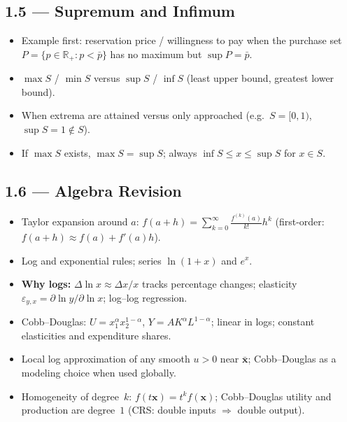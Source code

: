 \documentclass[11pt,a4paper]{article}
\begin{document}
\subsection{1.5 --- Supremum and Infimum}
\begin{itemize}[leftmargin=*]
    \item Example first: reservation price / willingness to pay when the purchase set
      $P=\{p\in\mathbb{R}_+:p<\bar p\}$ has no maximum but $\sup P=\bar p$.
    \item $\max S$ / $\min S$ versus $\sup S$ / $\inf S$ (least upper bound, greatest lower bound).
    \item When extrema are attained versus only approached (e.g.\ $S=[0,1)$, $\sup S=1\notin S$).
    \item If $\max S$ exists, $\max S=\sup S$; always $\inf S\le x\le\sup S$ for $x\in S$.
\end{itemize}

\subsection{1.6 --- Algebra Revision}
\begin{itemize}[leftmargin=*]
    \item Taylor expansion around $a$:
      $f(a+h)=\sum_{k=0}^{\infty}\frac{f^{(k)}(a)}{k!}h^k$ (first-order: $f(a+h)\approx f(a)+f'(a)h$).
    \item Log and exponential rules; series $\ln(1+x)$ and $e^x$.
    \item \textbf{Why logs:} $\Delta\ln x\approx \Delta x/x$ tracks percentage changes;
      elasticity $\varepsilon_{y,x}=\partial\ln y/\partial\ln x$; log--log regression.
    \item Cobb--Douglas: $U=x_1^{\alpha}x_2^{1-\alpha}$, $Y=AK^{\alpha}L^{1-\alpha}$;
      linear in logs; constant elasticities and expenditure shares.
    \item Local log approximation of any smooth $u>0$ near $\bar{\mathbf{x}}$;
      Cobb--Douglas as a modeling choice when used globally.
    \item Homogeneity of degree~$k$: $f(t\mathbf{x})=t^k f(\mathbf{x})$;
      Cobb--Douglas utility and production are degree~$1$ (CRS: double inputs $\Rightarrow$ double output).
\end{itemize}
\end{document}
